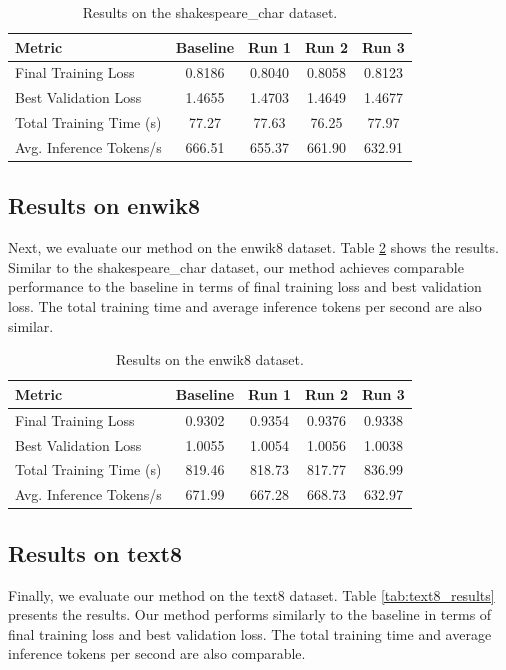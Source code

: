 \documentclass{article} %
\begin{document}
\begin{table}[h]
    \centering
    \begin{tabular}{lcccc}
        \toprule
        \textbf{Metric} & \textbf{Baseline} & \textbf{Run 1} & \textbf{Run 2} & \textbf{Run 3} \\
        \midrule
        Final Training Loss & 0.8186 & 0.8040 & 0.8058 & 0.8123 \\
        Best Validation Loss & 1.4655 & 1.4703 & 1.4649 & 1.4677 \\
        Total Training Time (s) & 77.27 & 77.63 & 76.25 & 77.97 \\
        Avg. Inference Tokens/s & 666.51 & 655.37 & 661.90 & 632.91 \\
        \bottomrule
    \end{tabular}
    \caption{Results on the shakespeare\_char dataset.}
    \label{tab:shakespeare_char_results}
\end{table}

\subsection{Results on enwik8}
Next, we evaluate our method on the enwik8 dataset. Table \ref{tab:enwik8_results} shows the results. Similar to the shakespeare\_char dataset, our method achieves comparable performance to the baseline in terms of final training loss and best validation loss. The total training time and average inference tokens per second are also similar.

\begin{table}[h]
    \centering
    \begin{tabular}{lcccc}
        \toprule
        \textbf{Metric} & \textbf{Baseline} & \textbf{Run 1} & \textbf{Run 2} & \textbf{Run 3} \\
        \midrule
        Final Training Loss & 0.9302 & 0.9354 & 0.9376 & 0.9338 \\
        Best Validation Loss & 1.0055 & 1.0054 & 1.0056 & 1.0038 \\
        Total Training Time (s) & 819.46 & 818.73 & 817.77 & 836.99 \\
        Avg. Inference Tokens/s & 671.99 & 667.28 & 668.73 & 632.97 \\
        \bottomrule
    \end{tabular}
    \caption{Results on the enwik8 dataset.}
    \label{tab:enwik8_results}
\end{table}

\subsection{Results on text8}
Finally, we evaluate our method on the text8 dataset. Table \ref{tab:text8_results} presents the results. Our method performs similarly to the baseline in terms of final training loss and best validation loss. The total training time and average inference tokens per second are also comparable.
\end{document}
